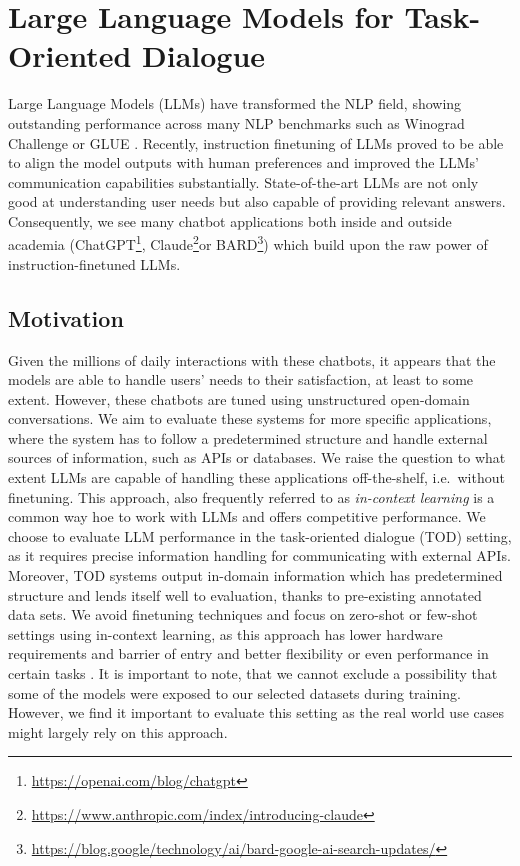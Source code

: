 \chapter{Large Language Models for Task-Oriented Dialogue}
\label{07:chap:lms}

\label{07:sec:intro}
Large Language Models (LLMs) have transformed the NLP field,
showing outstanding performance across many NLP benchmarks such as Winograd Challenge \cite{levesque2012winograd} or GLUE \cite{wang2018glue}.
Recently, instruction finetuning of LLMs proved to be able to align the model outputs with human preferences \cite{ouyang2022training,supernaturalinstructions} and improved the LLMs' communication capabilities substantially.
State-of-the-art LLMs are not only good at understanding user needs but also capable of providing relevant answers.
Consequently, we see many chatbot applications both inside and outside academia (ChatGPT\footnote{\url{https://openai.com/blog/chatgpt}}, Claude\footnote{\url{https://www.anthropic.com/index/introducing-claude}}or BARD\footnote{\url{https://blog.google/technology/ai/bard-google-ai-search-updates/}}) which build upon the raw power of instruction-finetuned LLMs.

\section{Motivation}
Given the millions of daily interactions with these chatbots, it appears that the models are able to handle users' needs to their satisfaction, at least to some extent.
However, these chatbots are tuned using unstructured open-domain conversations.
We aim to evaluate these systems
for more specific applications, where the system has to follow a predetermined structure and handle external sources of information, such as APIs or databases.
We raise the question to what extent LLMs are capable of handling these applications off-the-shelf, i.e.\ without finetuning.
This approach, also frequently referred to as \emph{in-context learning} is a common way hoe to work with LLMs and offers competitive performance.
We  choose to evaluate LLM performance in the task-oriented dialogue (TOD) setting,
as it requires precise information handling for communicating with external APIs.
Moreover, TOD systems output in-domain information which has predetermined structure and lends itself well to evaluation, thanks to pre-existing annotated data sets.
We avoid finetuning techniques and focus on zero-shot or few-shot settings using in-context learning, as this approach has lower hardware requirements and barrier of entry and better flexibility or even performance in certain tasks \cite{su2022selective}.
It is important to note, that we cannot exclude a possibility that some of the models were exposed to our selected datasets during training.
However, we find it important to evaluate this setting as the real world use cases might largely rely on this approach.

